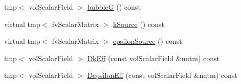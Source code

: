 \begin{DoxyCompactItemize}
\item 
tmp$<$ vol\+Scalar\+Field $>$ \hyperlink{classFoam_1_1RASModels_1_1mixtureKEpsilon_a627e30c80dd2737d19b4c4163b766488}{bubbleG} () const
\item 
virtual tmp$<$ fv\+Scalar\+Matrix $>$ \hyperlink{classFoam_1_1RASModels_1_1mixtureKEpsilon_abd7aa1bd65c38f9773745c8d98a2fed0}{k\+Source} () const
\item 
virtual tmp$<$ fv\+Scalar\+Matrix $>$ \hyperlink{classFoam_1_1RASModels_1_1mixtureKEpsilon_a11abcc44df285cf748c77aa0a7cac6b8}{epsilon\+Source} () const
\item 
tmp$<$ vol\+Scalar\+Field $>$ \hyperlink{classFoam_1_1RASModels_1_1mixtureKEpsilon_acb1a26f6c65825590d663e4e382e4851}{Dk\+Eff} (const vol\+Scalar\+Field \&nutm) const
\item 
tmp$<$ vol\+Scalar\+Field $>$ \hyperlink{classFoam_1_1RASModels_1_1mixtureKEpsilon_ababb0f32d48597fe6a0fccc5ed0b2c53}{Depsilon\+Eff} (const vol\+Scalar\+Field \&nutm) const
\end{DoxyCompactItemize}
